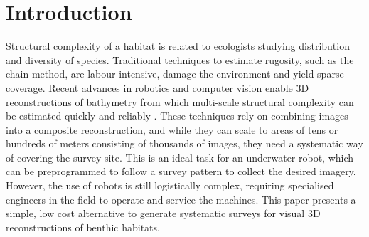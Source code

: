 \section{Introduction} 
\cite{Williams_2012}
\cite{Friedman_2012} \cite{Dustan_2013}
Structural complexity of a habitat is related to ecologists studying distribution and diversity of species. Traditional techniques to estimate rugosity, such as the chain method, are labour intensive, damage the environment and yield sparse coverage. Recent advances in robotics and computer vision enable 3D reconstructions of bathymetry from which multi-scale structural complexity can be estimated quickly and reliably \cite{Friedman_2012}. These techniques rely on combining images into a composite reconstruction, and while they can scale to areas of tens or hundreds of meters consisting of thousands of images, they need a systematic way of covering the survey site. This is an ideal task for an underwater robot, which can be preprogrammed to follow a survey pattern to collect the desired imagery. However, the use of robots is still logistically complex, requiring specialised engineers in the field to operate and service the machines.
This paper presents a simple, low cost alternative to generate systematic surveys for visual 3D reconstructions of benthic habitats. 



